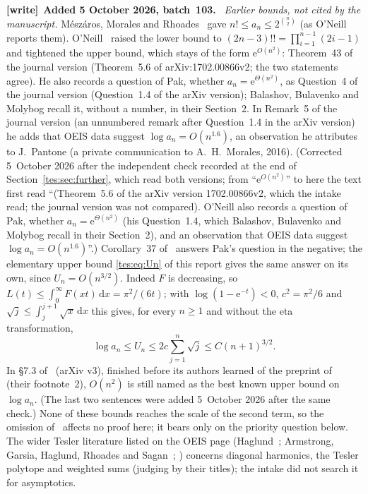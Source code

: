 \documentclass[11pt,a4paper]{article}
\theoremstyle{remark}\newtheorem{remark}[theorem]{Remark}
\newcommand{\ee}{\mathrm e}\newcommand{\dd}{\,\mathrm d}
\numberwithin{equation}{section}
\newenvironment{writenote}[1][]{\par\smallskip\begingroup\small
 \noindent\textbf{[write]}\if\relax\detokenize{#1}\relax\else~\textbf{#1.}\fi\ }%
 {\par\endgroup\smallskip}
\begin{document}
\begin{writenote}[Added 5 October 2026, batch~103]
\emph{Earlier bounds, not cited by the manuscript.} M\'esz\'aros, Morales
and Rhoades~\cite[\S4]{mmr} gave $n!\le a_n\le2^{\binom n2}$ (as O'Neill
reports them). O'Neill~\cite{oneill} raised the lower bound to
$(2n-3)!!=\prod_{i=1}^{n-1}(2i-1)$ and tightened the upper bound, which
stays of the form $\ee^{O(n^2)}$: Theorem~43 of the journal version
(Theorem~5.6 of arXiv:1702.00866v2; the two statements agree). He also
records a question of Pak, whether $a_n=\ee^{\Theta(n^2)}$, as Question~4
of the journal version (Question~1.4 of the arXiv version); Balashov,
Bulavenko and Molybog recall it, without a number, in their Section~2. In
Remark~5 of the journal version (an unnumbered remark after Question~1.4
in the arXiv version) he adds that OEIS data suggest
$\log a_n=O(n^{1.6})$, an observation he attributes to J.~Pantone (a
private communication to A.~H.~Morales, 2016). (Corrected 5~October 2026
after the independent check recorded at the end of
Section~\ref{tes:sec:further}, which read both versions; from
``$\ee^{O(n^2)}$'' to here the text first read ``(Theorem~5.6 of the arXiv
version 1702.00866v2, which the intake read; the journal version was not
compared). O'Neill also records a question of Pak, whether
$a_n=\ee^{\Theta(n^2)}$ (his Question~1.4, which Balashov, Bulavenko and
Molybog recall in their Section~2), and an observation that OEIS data
suggest $\log a_n=O(n^{1.6})$''.) Corollary~37 of~\cite{bbm} answers Pak's
question in the negative; the elementary upper bound \eqref{tes:eq:Un} of
this report gives the same answer on its own, since $U_n=O(n^{3/2})$.
Indeed $F$ is decreasing, so $L(t)\le\int_0^\infty F(xt)\dd x=\pi^2/(6t)$;
with $\log(1-\ee^{-t})<0$, $c^2=\pi^2/6$ and
$\sqrt j\le\int_j^{j+1}\sqrt x\dd x$ this gives, for every $n\ge1$ and
without the eta transformation,
\[
\log a_n\le U_n\le2c\sum_{j=1}^n\sqrt j\le C(n+1)^{3/2}.
\]
In \S7.3 of~\cite{lm} (arXiv v3), finished before its authors learned of
the preprint of~\cite{bbm} (their footnote~2), $O(n^2)$ is still named as
the best known upper bound on $\log a_n$. (The last two
sentences were added 5~October 2026 after the same check.) None of these
bounds reaches the scale of the second term, so the omission
of~\cite{oneill} affects no proof here; it bears only on the priority
question below. The wider Tesler literature listed on the
OEIS page (Haglund~\cite{haglund}; Armstrong, Garsia, Haglund, Rhoades and
Sagan~\cite{aghrs}; \cite{mmr}) concerns diagonal harmonics, the Tesler
polytope and weighted sums (judging by their titles); the
intake did not search it for asymptotics.


\end{writenote}
\end{document}
